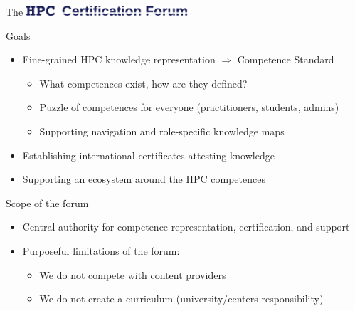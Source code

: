 \documentclass[compress,aspectratio=169]{beamer}
\begin{document}
\begin{frame}{The \includegraphics[width=0.45\textwidth]{hpccf-full}}
		\begin{block}{Goals}
			\begin{itemize}
				\item Fine-grained HPC knowledge representation $\Rightarrow$ Competence Standard
          \begin{itemize}
            \item What competences exist, how are they defined?
            \item Puzzle of competences for everyone (practitioners, students, admins)
            \item Supporting navigation and role-specific knowledge maps
          \end{itemize}
				\item Establishing international certificates attesting knowledge
        \item Supporting an ecosystem around the HPC competences
			\end{itemize}
		\end{block}

    \begin{block}{Scope of the forum}
    \begin{itemize}
      \item Central authority for competence representation, certification, and support
      \item Purposeful limitations of the forum:
			\begin{itemize}
				\item We do not compete with content providers
				\item We do not create a curriculum (university/centers responsibility)
			\end{itemize}
    \end{itemize}
		\end{block}
\end{frame}
\end{document}
